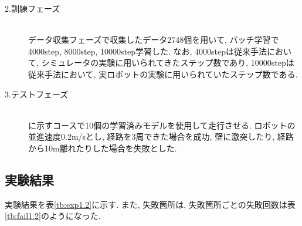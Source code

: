 \newpage
\begin{description}
  \item[2.訓練フェーズ]\mbox{}\\データ収集フェーズで収集したデータ2748個を用いて, バッチ学習で4000step, 8000step, 10000step学習した. なお, 4000stepは従来手法において, シミュレータの実験に用いられてきたステップ数であり, 10000stepは従来手法において, 実ロボットの実験に用いられていたステップ数である. 
\end{description}

\begin{description}
  \item[3.テストフェーズ]\mbox{}\\ に示すコースで10個の学習済みモデルを使用して走行させる. ロボットの並進速度0.2m/sとし, 経路を3周できた場合を成功, 壁に激突したり, 経路から10m離れたりした場合を失敗とした.
\end{description}

\subsection{実験結果}
実験結果を表\ref{tb:exp1.2}に示す. また, 失敗箇所は, 失敗箇所ごとの失敗回数は表\ref{tb:fail1.2}のようになった. 




